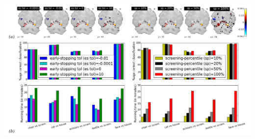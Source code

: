  \begin{pagefigure}
   \includegraphics[width=1\linewidth]{figures/screening_weights_haxby.png}
  \caption{Predicting age from gray-matter concentration maps from the
    OASIS dataset  \citep{marcus2007open}. \textbf{Top}:
    Weights maps (solutions to problem \eqref{eq:opt_pb}).
\textbf{Bottom-left}: Mean Square Error (MSE) in age prediction, for
different subjects of the validation set, for  varying levels of the
early-stopping tolerance (``es tol'' for short), with the
screening-percentile (sp) held constant at 100
(full-brain). \textbf{Bottom-right}: MSE in age prediction, for
varying levels of the screening-percentile (sp). \textbf{Running
  times}: Increasing \textit{est tol} (from $-10^{-4}$ to $10$): \textbf{100.2m, 171.4m, 188.8m, 289.6m}. For
increasing $sp$ ($10$ to $100$): \textbf{44.2m, 81.3m, 186.5m, 341.3m}}   
  \caption{Visual recognition dataset
     \citep{haxby2001}. \textbf{\textit{(a)}}: Weights maps
    for the Face vs House contrast,
    for different early-stopping and univariate feature-screening
    thresholds. One can see that the supports of these maps for
    different values of the thresholds are quite similar to cases
    involving  no heuristic at all (the case where est $= 10$ and the
    where case sp $=100\%$).
    \textbf{\textit{(b)}, top-left}: Prediction scores as a function of
    the early-stopping tolerance (est), for different task contrasts.
    \textbf{\textit{(b)}, top-right}: Prediction scores as a function of
    the screening-percentile (sp), for different task contrasts.
    \textbf{\textit{(b)}, bottom-row}: Running times in minutes for the
    different thresholds of the heuristics.
  }
  \label{fig:haxby}
\end{pagefigure}

